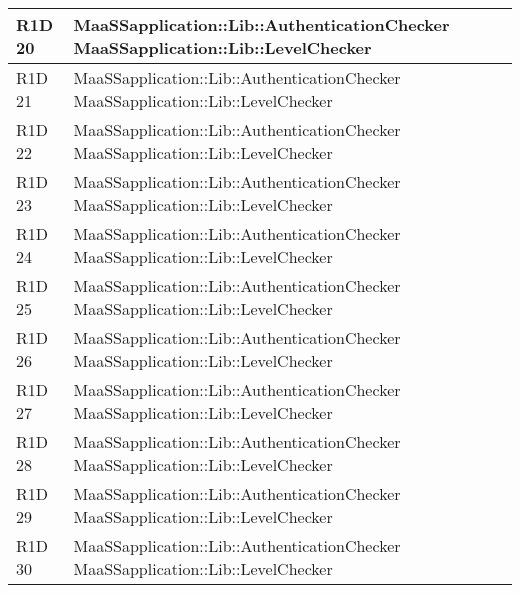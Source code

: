 \begin{center}
\begin{longtable}{ | l | p{8cm} |}
    R1D 20 & MaaSSapplication::Lib::AuthenticationChecker \newline MaaSSapplication::Lib::LevelChecker \\ \hline
    
    R1D 21 & MaaSSapplication::Lib::AuthenticationChecker \newline MaaSSapplication::Lib::LevelChecker \\ \hline
    
    R1D 22 & MaaSSapplication::Lib::AuthenticationChecker \newline MaaSSapplication::Lib::LevelChecker \\ \hline
    
    R1D 23 & MaaSSapplication::Lib::AuthenticationChecker \newline MaaSSapplication::Lib::LevelChecker \\ \hline
    
    R1D 24 & MaaSSapplication::Lib::AuthenticationChecker \newline MaaSSapplication::Lib::LevelChecker \\ \hline
    
    R1D 25 & MaaSSapplication::Lib::AuthenticationChecker \newline MaaSSapplication::Lib::LevelChecker \\ \hline

    R1D 26 & MaaSSapplication::Lib::AuthenticationChecker \newline MaaSSapplication::Lib::LevelChecker \\ \hline
    
    R1D 27 & MaaSSapplication::Lib::AuthenticationChecker \newline MaaSSapplication::Lib::LevelChecker \\ \hline
    
    R1D 28 & MaaSSapplication::Lib::AuthenticationChecker \newline MaaSSapplication::Lib::LevelChecker \\ \hline
    
    R1D 29 & MaaSSapplication::Lib::AuthenticationChecker \newline MaaSSapplication::Lib::LevelChecker \\ \hline
    
    R1D 30 & MaaSSapplication::Lib::AuthenticationChecker \newline MaaSSapplication::Lib::LevelChecker \\ \hline


\end{longtable}
\end{center}

